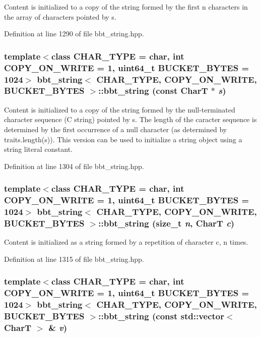 Content is initialized to a copy of the string formed by the first n characters in the array of characters pointed by s. 

Definition at line 1290 of file bbt\_\-string.hpp.\hypertarget{classbbt__string_ace6416bbc018cb5fd7e0ebd836d929d}{
\subsubsection[{bbt\_\-string}]{\setlength{\rightskip}{0pt plus 5cm}template$<$class CHAR\_\-TYPE  = char, int COPY\_\-ON\_\-WRITE = 1, uint64\_\-t BUCKET\_\-BYTES = 1024$>$ {\bf bbt\_\-string}$<$ CHAR\_\-TYPE, COPY\_\-ON\_\-WRITE, BUCKET\_\-BYTES $>$::{\bf bbt\_\-string} (const CharT $\ast$ {\em s})}}
\label{classbbt__string_ace6416bbc018cb5fd7e0ebd836d929d}


Content is initialized to a copy of the string formed by the null-terminated character sequence (C string) pointed by s. The length of the caracter sequence is determined by the first occurrence of a null character (as determined by traits.length(s)). This version can be used to initialize a string object using a string literal constant. 

Definition at line 1304 of file bbt\_\-string.hpp.\hypertarget{classbbt__string_bd88607f68eba44af1456842d08fb72b}{
\subsubsection[{bbt\_\-string}]{\setlength{\rightskip}{0pt plus 5cm}template$<$class CHAR\_\-TYPE  = char, int COPY\_\-ON\_\-WRITE = 1, uint64\_\-t BUCKET\_\-BYTES = 1024$>$ {\bf bbt\_\-string}$<$ CHAR\_\-TYPE, COPY\_\-ON\_\-WRITE, BUCKET\_\-BYTES $>$::{\bf bbt\_\-string} (size\_\-t {\em n}, \/  CharT {\em c})}}
\label{classbbt__string_bd88607f68eba44af1456842d08fb72b}


Content is initialized as a string formed by a repetition of character c, n times. 

Definition at line 1315 of file bbt\_\-string.hpp.\hypertarget{classbbt__string_86c2a8194f3ec4902b3410c806baae4c}{
\subsubsection[{bbt\_\-string}]{\setlength{\rightskip}{0pt plus 5cm}template$<$class CHAR\_\-TYPE  = char, int COPY\_\-ON\_\-WRITE = 1, uint64\_\-t BUCKET\_\-BYTES = 1024$>$ {\bf bbt\_\-string}$<$ CHAR\_\-TYPE, COPY\_\-ON\_\-WRITE, BUCKET\_\-BYTES $>$::{\bf bbt\_\-string} (const std::vector$<$ CharT $>$ \& {\em v})}}
\label{classbbt__string_86c2a8194f3ec4902b3410c806baae4c}


